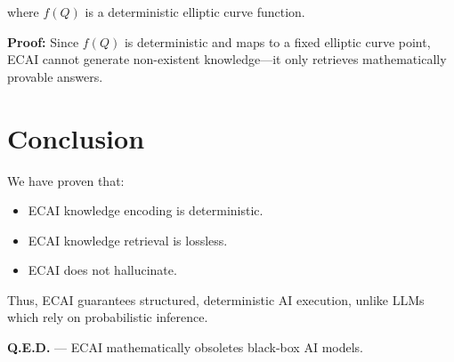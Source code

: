 \documentclass{article}
\begin{document}
where $f(Q)$ is a deterministic elliptic curve function.

\textbf{Proof:} Since $f(Q)$ is deterministic and maps to a fixed elliptic curve point, ECAI cannot generate non-existent knowledge—it only retrieves mathematically provable answers.

\section{Conclusion}

We have proven that:
\begin{itemize}
    \item ECAI knowledge encoding is deterministic.
    \item ECAI knowledge retrieval is lossless.
    \item ECAI does not hallucinate.
\end{itemize}

Thus, ECAI guarantees structured, deterministic AI execution, unlike LLMs which rely on probabilistic inference.

\textbf{Q.E.D.} — ECAI mathematically obsoletes black-box AI models.
\end{document}
